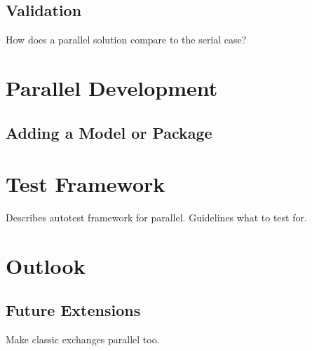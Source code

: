\section{Validation}
How does a parallel solution compare to the serial case?

\chapter{Parallel Development}

\section{Adding a Model or Package}

\chapter{Test Framework}

Describes autotest framework for parallel. Guidelines what to test for.

\chapter{Outlook}

\section{Future Extensions}
Make classic exchanges parallel too.